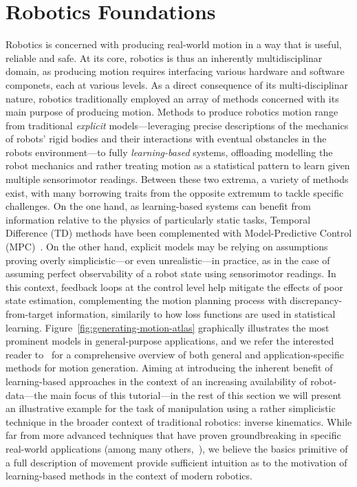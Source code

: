 \section{Robotics Foundations}
\label{sec:classical}

Robotics is concerned with producing real-world motion in a way that is useful, reliable and safe. 
At its core, robotics is thus an inherently multidisciplinar domain, as producing motion requires interfacing various hardware and software componets, each at various levels. 
As a direct consequence of its multi-disciplinar nature, robotics traditionally employed an array of methods concerned with its main purpose of producing motion.
Methods to produce robotics motion range from traditional \emph{explicit} models---leveraging precise descriptions of the mechanics of robots' rigid bodies and their interactions with eventual obstancles in the robots environment---to fully \emph{learning-based} systems, offloading modelling the robot mechanics and rather treating motion as a statistical pattern to learn given multiple sensorimotor readings.
Between these two extrema, a variety of methods exist, with many borrowing traits from the opposite extremum to tackle specific challenges. 
On the one hand, as learning-based systems can benefit from information relative to the physics of particularly static tasks, Temporal Difference (TD) methods have been complemented with Model-Predictive Control (MPC)~\citep{TDMPC}.
On the other hand, explicit models may be relying on assumptions proving overly simplicistic---or even unrealistic---in practice, as in the case of assuming perfect observability of a robot state using sensorimotor readings. In this context, feedback loops at the control level help mitigate the effects of poor state estimation, complementing the motion planning process with discrepancy-from-target information, similarily to how loss functions are used in statistical learning.
Figure~\ref{fig:generating-motion-atlas} graphically illustrates the most prominent models in general-purpose applications, and we refer the interested reader to~\citet{STATUS_OF_MOTION_GENERATION} for a comprehensive overview of both general and application-specific methods for motion generation.
Aiming at introducing the inherent benefit of learning-based approaches in the context of an increasing availability of robot-data---the main focus of this tutorial---in the rest of this section we will present an illustrative example for the task of manipulation using a rather simplicistic technique in the broader context of traditional robotics: inverse kinematics.
While far from more advanced techniques that have proven groundbreaking in specific real-world applications (among many others,~\citep{KATHIB_POTENTIAL_FIELD, SEQUENTIAL_COMPOSITION_OF_DYNAMICALLY_DEXTEROUS}), we believe the basics primitive of a full description of movement provide sufficient intuition as to the motivation of learning-based methods in the context of modern robotics.

